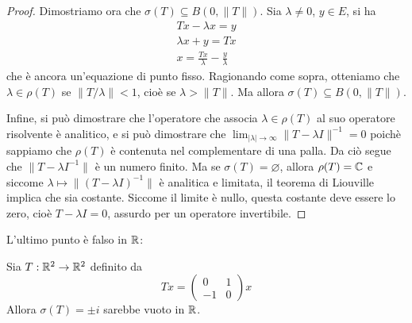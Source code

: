 \begin{proof}
	Dimostriamo ora che $\sigma(T) \subseteq B(0, \|T\|)$.
	Sia $\lambda \neq 0$, $y \in E$, si ha
	\begin{gather*}
		Tx-\lambda x = y\\
		\lambda x + y = Tx\\
		x = \frac{Tx}\lambda - \frac{y}\lambda
	\end{gather*}
	che è ancora un'equazione di punto fisso. Ragionando come sopra, otteniamo che $\lambda \in \rho(T)$ se $\|T/\lambda\| < 1$, cioè se $\lambda > \|T\|$. Ma allora $\sigma(T) \subseteq B(0,\|T\|)$.

	Infine, si può dimostrare che l'operatore che associa $\lambda \in \rho(T)$ al suo operatore risolvente è analitico, e si può dimostrare che $\lim_{|\lambda| \to \infty} \|T-\lambda I\|^{-1} = 0$ poichè sappiamo che $\rho(T)$ è contenuta nel complementare di una palla. Da ciò segue che $\|T-\lambda I^{-1}\|$ è un numero finito.
	Ma se $\sigma(T) = \varnothing$, allora $\rho(T) = \mathbb{C}$ e siccome $\lambda \mapsto \|(T-\lambda I)^{-1}\|$ è analitica e limitata, il teorema di Liouville implica che sia costante.
	Siccome il limite è nullo, questa costante deve essere lo zero, cioè $T-\lambda I = 0$, assurdo per un operatore invertibile.
\end{proof}

L'ultimo punto è falso in $\mathbb{R}$:

\begin{remark}
	Sia $T:\mathbb{R}^2 \to \mathbb{R}^2$ definito da
	\begin{equation*}
		Tx  = \begin{pmatrix}
			0 & 1\\
			-1 & 0
		\end{pmatrix}x
	\end{equation*}
	Allora $\sigma(T) = \pm i$ sarebbe vuoto in $\mathbb{R}$.
\end{remark}

